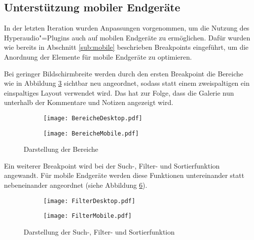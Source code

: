 \subsection{Unterstützung mobiler Endgeräte}
In der letzten Iteration wurden Anpassungen vorgenommen, um die Nutzung des Hyperaudio"=Plugins auch auf mobilen Endgeräte zu ermöglichen. Dafür wurden wie bereits in Abschnitt \ref{sub:mobile} beschrieben Breakpoints eingeführt, um die Anordnung der Elemente für mobile Endgeräte zu optimieren.

Bei geringer Bildschirmbreite werden durch den ersten Breakpoint die Bereiche wie in Abbildung \ref{fig:BereicheDesktopMobile} sichtbar neu angeordnet, sodass statt einem zweispaltigen ein einspaltiges Layout verwendet wird. Das hat zur Folge, dass die Galerie nun unterhalb der Kommentare und Notizen angezeigt wird.

\begin{figure}[h!]
\begin{subfigure}[c]{0.5\textwidth}
\texttt{[image: BereicheDesktop.pdf]}
\label{fig:BereicheDesktop}
\end{subfigure}%
\begin{subfigure}[c]{0.5\textwidth}
\texttt{[image: BereicheMobile.pdf]}
\label{fig:BereicheMobile}
\end{subfigure}
\caption{Darstellung der Bereiche}
\label{fig:BereicheDesktopMobile}
\end{figure}

Ein weiterer Breakpoint wird bei der Such-, Filter- und Sortierfunktion angewandt. Für mobile Endgeräte werden diese Funktionen untereinander statt nebeneinander angeordnet (siehe Abbildung \ref{fig:FilterDesktopMobile}).

\begin{figure}[h!]
\begin{subfigure}[c]{0.5\textwidth}
\texttt{[image: FilterDesktop.pdf]}
\label{fig:FilterDesktop}
\end{subfigure}%
\begin{subfigure}[c]{0.5\textwidth}
\texttt{[image: FilterMobile.pdf]}
\label{fig:FilterMobile}
\end{subfigure}
\caption{Darstellung der Such-, Filter- und Sortierfunktion}
\label{fig:FilterDesktopMobile}
\end{figure}

